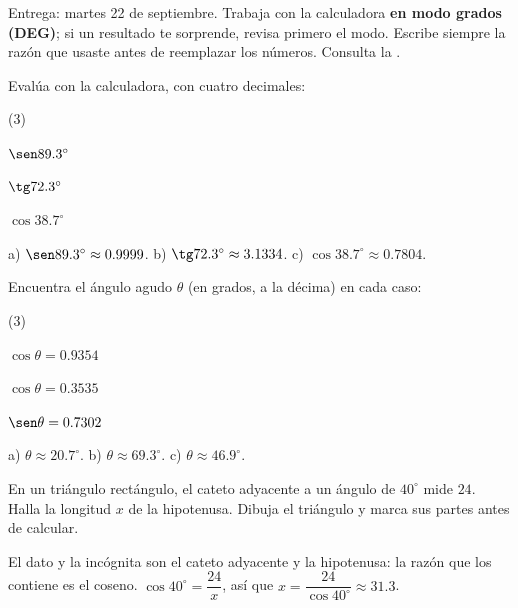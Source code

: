 \documentclass[11pt]{article}
\begin{document}
\encabezado

\begin{instrucciones}
Entrega: martes 22 de septiembre. Trabaja con la calculadora \textbf{en modo grados
(DEG)}; si un resultado te sorprende, revisa primero el modo. Escribe siempre la razón
que usaste antes de reemplazar los números. Consulta la .
\end{instrucciones}

\begin{preguntas}

\pregunta Evalúa con la calculadora, con cuatro decimales:
\begin{opciones*}(3)
  \item $\sen \num{89,3}^\circ$
  \item $\tg \num{72,3}^\circ$
  \item $\cos \num{38,7}^\circ$
\end{opciones*}
\begin{solucion}[2cm]
a) $\sen \num{89,3}^\circ \approx \num{0,9999}$. \quad
b) $\tg \num{72,3}^\circ \approx \num{3,1334}$. \quad
c) $\cos \num{38,7}^\circ \approx \num{0,7804}$.
\end{solucion}

\pregunta Encuentra el ángulo agudo $\theta$ (en grados, a la décima) en cada caso:
\begin{opciones*}(3)
  \item $\cos\theta = \num{0,9354}$
  \item $\cos\theta = \num{0,3535}$
  \item $\sen\theta = \num{0,7302}$
\end{opciones*}
\begin{solucion}[2cm]
a) $\theta \approx \num{20,7}^\circ$. \quad b) $\theta \approx \num{69,3}^\circ$. \quad
c) $\theta \approx \num{46,9}^\circ$.
\end{solucion}

\pregunta En un triángulo rectángulo, el cateto adyacente a un ángulo de $40^\circ$ mide
$24$. Halla la longitud $x$ de la hipotenusa. Dibuja el triángulo y marca sus partes antes
de calcular.
\begin{solucion}[3cm]
El dato y la incógnita son el cateto adyacente y la hipotenusa: la razón que los contiene
es el coseno. $\cos 40^\circ = \dfrac{24}{x}$, así que
$x = \dfrac{24}{\cos 40^\circ} \approx \num{31,3}$.
\end{solucion}


\end{preguntas}
\end{document}
